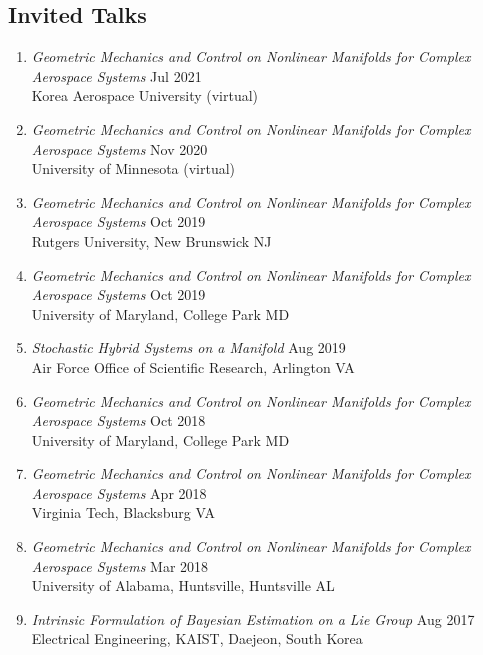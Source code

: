 \documentclass[10pt]{article}
\begin{document}
\subsection*{Invited Talks}
\begin{enumerate}[itemsep=2pt,parsep=2pt]
    \renewcommand{\labelenumi}{[\arabic{enumi}]}
\item \textit{Geometric Mechanics and Control on Nonlinear Manifolds for Complex Aerospace Systems} \hfill Jul 2021\\
    Korea Aerospace University (virtual)

\item \textit{Geometric Mechanics and Control on Nonlinear Manifolds for Complex Aerospace Systems} \hfill Nov 2020\\
    University of Minnesota (virtual)

\item \textit{Geometric Mechanics and Control on Nonlinear Manifolds for Complex Aerospace Systems} \hfill Oct 2019\\
    Rutgers University, New Brunswick NJ

\item \textit{Geometric Mechanics and Control on Nonlinear Manifolds for Complex Aerospace Systems}  \hfill Oct 2019\\
    {University of Maryland}, College Park MD

\item \textit{Stochastic Hybrid Systems on a Manifold}   \hfill Aug 2019 \\
    Air Force Office of Scientific Research, Arlington VA

\item \textit{Geometric Mechanics and Control on Nonlinear Manifolds for Complex Aerospace Systems}  \hfill Oct 2018\\
    {University of Maryland}, College Park MD

\item \textit{Geometric Mechanics and Control on Nonlinear Manifolds for Complex Aerospace Systems}  \hfill Apr 2018\\
    {Virginia Tech}, Blacksburg VA

\item \textit{Geometric Mechanics and Control on Nonlinear Manifolds for Complex Aerospace Systems}  \hfill Mar 2018\\
    {University of Alabama, Huntsville}, Huntsville AL

\item \textit{Intrinsic Formulation of Bayesian Estimation on a Lie Group}  \hfill Aug 2017\\
    {Electrical Engineering, KAIST}, Daejeon, South Korea


\end{enumerate}
\end{document}
